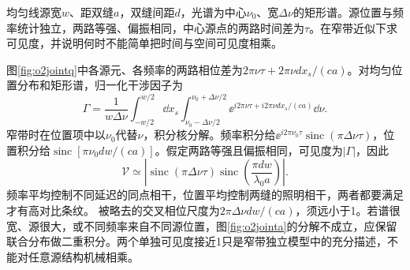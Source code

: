\begin{exercise}\label{ex:o2jointcoherence}
均匀线源宽$w$、距双缝$a$，双缝间距$d$，光谱为中心$\nu_0$、宽$\Delta\nu$的矩形谱。源位置与频率统计独立，两路等强、偏振相同，中心源点的两路时间差为$\tau$。在窄带近似下求可见度，并说明何时不能简单把时间与空间可见度相乘。
\end{exercise}
\begin{solution}
图\ref{fig:o2jointq}中各源元、各频率的两路相位差为$2\pi\nu\tau+2\pi\nu d x_s/(ca)$。对均匀位置分布和矩形谱，归一化干涉因子为
\[
 \Gamma=\frac1{w\Delta\nu}\int_{-w/2}^{w/2}\dd x_s
 \int_{\nu_0-\Delta\nu/2}^{\nu_0+\Delta\nu/2}
 \ee^{i2\pi\nu\tau+i2\pi\nu d x_s/(ca)}\dd\nu.
\]
窄带时在位置项中以$\nu_0$代替$\nu$，积分核分解。频率积分给$\ee^{i2\pi\nu_0\tau}\operatorname{sinc}(\pi\Delta\nu\tau)$，位置积分给$\operatorname{sinc}[\pi\nu_0dw/(ca)]$。假定两路等强且偏振相同，可见度为$|\Gamma|$，因此
\[
 \mathcal V\simeq\left|\operatorname{sinc}(\pi\Delta\nu\tau)
 \operatorname{sinc}\left(\frac{\pi dw}{\lambda_0a}\right)\right|.
\]
频率平均控制不同延迟的同点相干，位置平均控制两缝的照明相干，两者都要满足才有高对比条纹。
被略去的交叉相位尺度为$2\pi\Delta\nu d w/(ca)$，须远小于1。若谱很宽、源很大，或不同频率来自不同源位置，图\ref{fig:o2jointa}的分解不成立，应保留联合分布做二重积分。两个单独可见度接近1只是窄带独立模型中的充分描述，不能对任意源结构机械相乘。
\end{solution}
